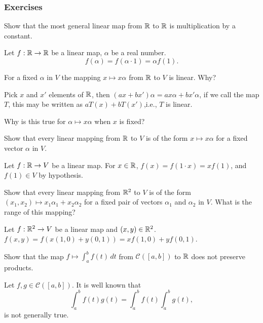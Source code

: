 \documentclass[../../main.tex]{subfiles}
\begin{document}
\subsubsection{Exercises}
\begin{problem}
Show that the most general linear map from $\mathbb{R}$ to $\mathbb{R}$ is multiplication by a constant.	
\end{problem}
\begin{solution}
	Let $f: \mathbb{R} \to \mathbb{R}$ be a linear map, $\alpha$ be a real number.
	\[
		f(\alpha) = f(\alpha \cdot 1) = \alpha f(1).
	\]
\end{solution}
\begin{problem}
	For a fixed $\alpha$ in $V$ the mapping $x \mapsto x \alpha$ from $\mathbb{R}$ to $V$ is linear. Why?
\end{problem}
\begin{solution}
	Pick $x$ and $x'$ elements of $\mathbb{R}$, then $(ax + bx')\alpha = ax\alpha + bx'\alpha$, if we call the map $T$, this may be written as $aT(x) + bT(x')$,i.e., $T$ is linear.
\end{solution}
\begin{problem}
	Why is this true for $\alpha \mapsto x\alpha$ when $x$ is fixed?
\end{problem}
\begin{problem}
	Show that every linear mapping from $\mathbb{R}$ to $V$ is of the form $x \mapsto x \alpha$ for a fixed vector $\alpha$ in $V$.
\end{problem}
\begin{solution}
	Let $f: \mathbb{R} \to V$ be a linear map. For $x \in \mathbb{R}$, $f(x) = f(1 \cdot x) = xf(1)$, and $f(1) \in V$ by hypothesis.
\end{solution}
\begin{problem}
	Show that every linear mapping from $\mathbb{R}^2$ to $V$ is of the form $(x_1, x_2) \mapsto x_1\alpha_1 + x_2\alpha_2$ for a fixed pair of vectors $\alpha_1$ and $\alpha_2$ in $V$. What is the range of this mapping?
\end{problem}
\begin{solution}
	Let $f: \mathbb{R}^2 \to V$ be a linear map and $(x,y) \in \mathbb{R}^2$. $f(x,y) = f(x(1,0) + y(0, 1)) = xf(1,0) + yf(0,1)$.
\end{solution}
\begin{problem}
	Show that the map $f \mapsto \int_a^b f(t) \,dt$ from $\mathcal{C}([a,b])$ to $\mathbb{R}$ does not preserve products.
\end{problem}
\begin{solution}
	Let $f,g \in \mathcal{C}([a,b])$. It is well known that 
	\[
		\int_a^b f(t)g(t) = \int_a^b f(t) \int_a^b g(t),
	\]
	is not generally true.
\end{solution}
\end{document}
